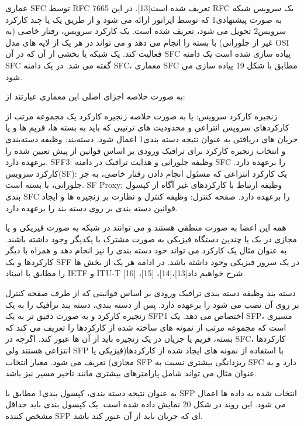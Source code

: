 \documentclass{book}
\begin{document}

عماری SFC توسط RFC 7665 تعریف شده است[13]. در این RFC یک سرویس شبکه به صورت پیشنهادی1 که توسط اپراتور ارائه می شود و از طریق یک یا چند کارکرد سرویس2 تحویل می شود، تعریف شده است. یک کارکرد سرویس، رفتار خاصی (به غیر از جلورانی) با بسته را انجام می دهد و می تواند در هر یک از لایه های مدل OSI فعالیت کند. یک شبکه یا بخشی از آن که در آن SFC  پیاده سازی شده است یک دامنه SFC گفته می شد. در یک دامنه SFC، معماری SFC مطابق با شکل 19 پیاده سازی می شود.

به صورت خلاصه اجزای اصلی این معماری عبارتند از:

 زنجیره کارکرد سرویس: یا به صورت خلاصه زنجیره کارکرد یک مجموعه مرتب از کارکردهای سرویس انتراعی و محدودیت های ترتیبی که باید به بسته ها، فریم ها و یا جریان های دریافتی به عنوان نتیجه دسته بندی1 اعمال شود.
 دسته‌بند: وظیفه دسته‌بندی و انتخاب زنجیره کارکرد برای ترافیک ورودی بر اساس قوانین از پیش تعیین شده را برعهده دارد.
 SFF3: وظیفه جلورانی و هدایت ترافیک در دامنه SFC را برعهده دارد.
 کارکرد سرویس(SF): یک کارکرد انتزاعی که مسئول انجام دادن رفتار خاصی، به جز جلورانی، با بسته است.
 SF Proxy: وظیفه ارتباط با کارکردهای غیر آگاه از کپسول بندی SFC را برعهده دارد.
 صفحه کنترل: وظیفه کنترل و نظارت بر زنجیره ها و ایجاد قوانین دسته بندی بر روی دسته بند را برعهده دارد.

همه این اعضا به صورت منطقی هستند و می توانند در شبکه به صورت فیزیکی و یا مجازی در یک یا چندین دستگاه فیزیکی به صورت مشترک با یکدیگر وجود داشته باشند. به عنوان مثال یک کارکرد می تواند خود دسته بندی را نیز انجام دهد و همراه با دیگر کارکردها و یک SFF در یک سرور فیزیکی وجود داشته باشد. در ادامه هر یک از بخش ها را مطابق با اسناد IETF و ITU-T شرح خواهیم داد[13]،[14]، [15]، [16].


دسته بند وظیفه دسته بندی ترافیک ورودی بر اساس قوانینی که از طرف صفحه کنترل بر روی آن نصب می شود را برعهده دارد. پس از دسته بندی، دسته بند ترافیک را به یک زنجیره کارکرد و به صورت دقیق تر به یک SFP1  اختصاص می دهد. یک SFP، مسیری است که مجموعه مرتب از نمونه های ساخته شده از کارکردها را تعریف می کند که بسته، فریم یا جریان در یک زنجیره باید از آن ها عبور کند. اگرچه در SFC، کارکردها انتزاعی هستند ولی SFP با استفاده از نمونه های ایجاد شده از کارکردها(فیزیکی یا مجازی) تعریف می شود. معیار انتخاب SFP ریزدانگی بیشتری نسبت به SFC دارد و به عنوان مثال می تواند شامل پارامترهای بیشتری مانند تاخیر مسیر نیز باشد.

به عنوان نتیجه دسته بندی، کپسول بندی1 مطابق با SFP انتخاب شده به داده ها اعمال می شود. این روند در شکل 20 نمایش داده شده است. یک کپسول بندی باید حداقل مشخص کننده SFP ای که جریان باید از آن عبور کند باشد.
\end{document}

